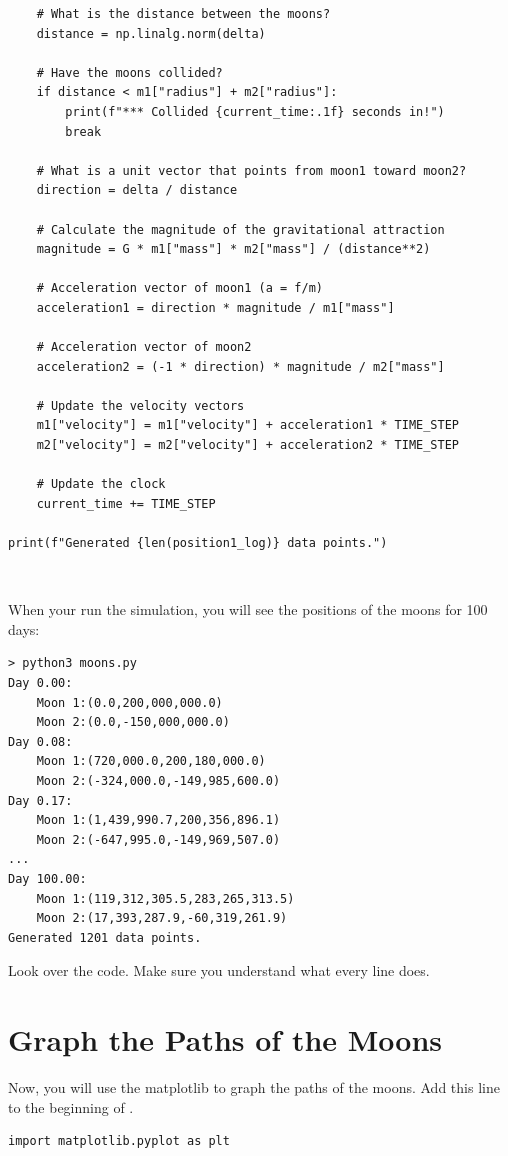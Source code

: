 \begin{verbatim}
    # What is the distance between the moons?
    distance = np.linalg.norm(delta)

    # Have the moons collided?
    if distance < m1["radius"] + m2["radius"]:
        print(f"*** Collided {current_time:.1f} seconds in!")
        break

    # What is a unit vector that points from moon1 toward moon2?
    direction = delta / distance

    # Calculate the magnitude of the gravitational attraction
    magnitude = G * m1["mass"] * m2["mass"] / (distance**2)

    # Acceleration vector of moon1 (a = f/m)
    acceleration1 = direction * magnitude / m1["mass"]

    # Acceleration vector of moon2
    acceleration2 = (-1 * direction) * magnitude / m2["mass"]

    # Update the velocity vectors
    m1["velocity"] = m1["velocity"] + acceleration1 * TIME_STEP
    m2["velocity"] = m2["velocity"] + acceleration2 * TIME_STEP

    # Update the clock
    current_time += TIME_STEP

print(f"Generated {len(position1_log)} data points.")
\end{verbatim}\

When your run the simulation,  you will see the positions of the moons for 100 days:
\begin{verbatim}
> python3 moons.py 
Day 0.00:
	Moon 1:(0.0,200,000,000.0)
	Moon 2:(0.0,-150,000,000.0)
Day 0.08:
	Moon 1:(720,000.0,200,180,000.0)
	Moon 2:(-324,000.0,-149,985,600.0)
Day 0.17:
	Moon 1:(1,439,990.7,200,356,896.1)
	Moon 2:(-647,995.0,-149,969,507.0)
...
Day 100.00:
	Moon 1:(119,312,305.5,283,265,313.5)
	Moon 2:(17,393,287.9,-60,319,261.9)
Generated 1201 data points.
\end{verbatim}

Look over the code. Make sure you understand what every line does.

\section{Graph the Paths of the Moons}

Now, you will use the matplotlib to graph the paths of the moons. Add this line to the beginning of 
.

\begin{verbatim}
import matplotlib.pyplot as plt
\end{verbatim}


